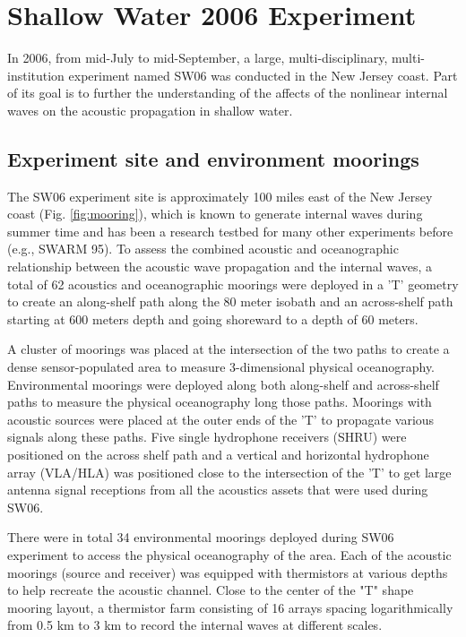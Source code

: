 \chapter{Shallow Water 2006 Experiment}
In 2006, from mid-July to mid-September, a large, multi-disciplinary, multi-institution experiment named SW06 was conducted in the New Jersey coast. Part of its goal is to further the understanding of the affects of the nonlinear internal waves on the acoustic propagation in shallow water.

\section{Experiment site and environment moorings}
The SW06 experiment site is approximately 100 miles east of the New Jersey coast (Fig. \ref{fig:mooring}), which is known to generate internal waves during summer time and has been a research testbed for many other experiments before (e.g., SWARM 95). To assess the combined acoustic and oceanographic relationship between the acoustic wave propagation and the internal waves, a total of 62 acoustics and oceanographic moorings were deployed in a 'T' geometry to create an along-shelf path along  the 80 meter isobath and an across-shelf path starting at 600 meters depth and going shoreward to a depth of 60  
meters.  

A cluster of moorings was placed at the intersection of the two paths to create a dense sensor-populated area  
to measure 3-dimensional physical oceanography. Environmental moorings were deployed along both along-shelf and  
across-shelf paths to measure the physical oceanography long those paths. Moorings with acoustic sources were  
placed at the outer ends of the 'T' to propagate various signals along these paths.  Five single hydrophone receivers  
(SHRU) were positioned on the across shelf path and a vertical and horizontal hydrophone array (VLA/HLA) was  
positioned close to the intersection of the 'T' to get large antenna signal receptions from all the acoustics assets that  
were used during SW06.   


There were in total 34 environmental moorings deployed during SW06 experiment to access the physical oceanography of the area. Each of the acoustic moorings (source and receiver) was equipped with thermistors at various depths to help recreate the acoustic channel. Close to the center of the "T" shape mooring layout, a thermistor farm consisting of 16 arrays spacing logarithmically from 0.5 km to 3 km to record the internal waves at different scales. 


